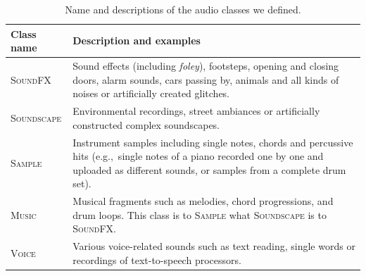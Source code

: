 \begin{table}
\begin{center}
\footnotesize
\begin{tabular}{lp{9cm}}
\toprule
\multicolumn{1}{l}{\textbf{Class name}}	& \textbf{Description and examples} \\
\midrule
\textsc{SoundFX} & Sound effects (including \emph{foley}), footsteps, opening and closing doors, alarm sounds, cars passing by, animals and all kinds of noises or artificially created glitches.\\
\textsc{Soundscape} & Environmental recordings, street ambiances or artificially constructed complex soundscapes. \\
\textsc{Sample} & Instrument samples including single notes, chords and percussive hits (e.g.,~single notes of a piano recorded one by one and uploaded as different sounds, or samples from a complete drum set). \\
\textsc{Music} & Musical fragments such as melodies, chord progressions, and drum loops. This class is to \textsc{Sample} what \textsc{Soundscape} is to \textsc{SoundFX}. \\
\textsc{Voice} & Various voice-related sounds such as text reading, single words or recordings of text-to-speech processors. \\ 
\bottomrule
\end{tabular}
\end{center}
\caption[Name and descriptions of the audio classes]{Name and descriptions of the audio classes we defined.}
\label{tab:audio_classes}
\end{table}

